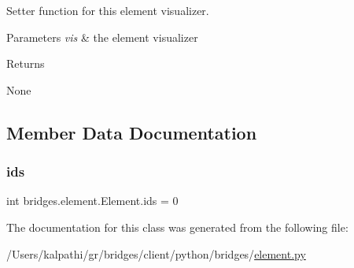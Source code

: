 Setter function for this element visualizer. 


\begin{DoxyParams}{Parameters}
{\em vis} & the element visualizer \\
\hline
\end{DoxyParams}
\begin{DoxyReturn}{Returns}


None 
\end{DoxyReturn}


\subsection{Member Data Documentation}
\mbox{\label{classbridges_1_1element_1_1_element_a61f02c915a65554b76dd6534e5a4d834}} 
\subsubsection{\texorpdfstring{ids}{ids}}
{\footnotesize\ttfamily int bridges.\+element.\+Element.\+ids = 0\hspace{0.3cm}{\ttfamily [static]}}



The documentation for this class was generated from the following file\+:\begin{DoxyCompactItemize}
\item 
/\+Users/kalpathi/gr/bridges/client/python/bridges/\mbox{\hyperlink{element_8py}{element.\+py}}\end{DoxyCompactItemize}

